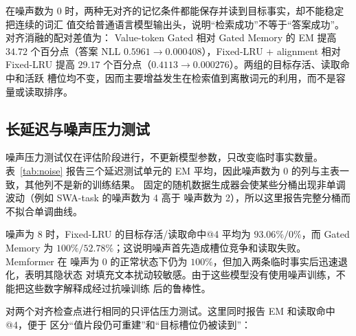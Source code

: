 \documentclass[letterpaper]{article}
\begin{document}
在噪声数为 0 时，两种无对齐的记忆条件都能保存并读到目标事实，却不能稳定把连续的词汇
值交给普通语言模型输出头，说明“检索成功”不等于“答案成功”。对齐消融的配对差值为：
Value-token Gated 相对 Gated Memory 的 EM 提高 $34.72$ 个百分点（答案 NLL
$0.5961\rightarrow0.000408$），Fixed-LRU + alignment 相对 Fixed-LRU 提高
$29.17$ 个百分点（$0.4113\rightarrow0.000276$）。两组的目标存活、读取命中和活跃
槽位均不变，因而主要增益发生在检索值到离散词元的利用，而不是容量或读取排序。

\subsection{长延迟与噪声压力测试}

噪声压力测试仅在评估阶段进行，不更新模型参数，只改变临时事实数量。表~\ref{tab:noise}
报告三个延迟测试单元的 EM 平均，因此噪声数为 0 的列与主表一致，其他列不是新的训练结果。
固定的随机数据生成器会使某些分桶出现非单调波动（例如 SWA-task 的噪声数为 4 高于
噪声数为 2），所以这里报告完整分桶而不拟合单调曲线。

\begin{table}[t]
\centering
\scriptsize
\caption{只评估噪声压力测试的 EM（\%，每个噪声分桶含三个延迟、共 72 条）。}
\label{tab:noise}
%
\end{table}

噪声为 $8$ 时，Fixed-LRU 的目标存活/读取命中@4 平均为 $93.06\%/0\%$，而 Gated
Memory 为 $100\%/52.78\%$；这说明噪声首先造成槽位竞争和读取失败。Memformer 在
噪声为 $0$ 的正常状态下仍为 $100\%$，但加入两条临时事实后迅速退化，表明其隐状态
对填充文本扰动较敏感。由于这些模型没有使用噪声训练，不能把这些数字解释成经过抗噪训练
后的鲁棒性。

对两个对齐检查点进行相同的只评估压力测试。这里同时报告 EM 和读取命中@4，便于
区分“值片段仍可重建”和“目标槽位仍被读到”：

\begin{table}[t]
\centering
\scriptsize
\caption{对齐模型噪声压力测试。单元格为 EM / 读取命中@4（\%，三个延迟的平均）。}
\label{tab:alignment-noise}
%
\end{table}
\end{document}

